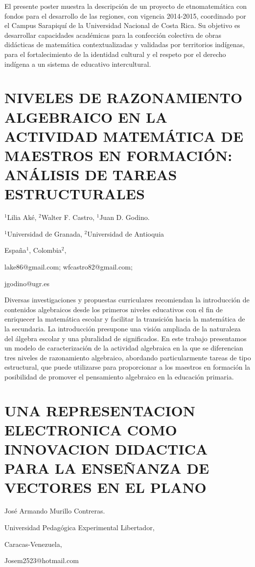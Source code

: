 El presente poster muestra la descripción de un proyecto de etnomatemática
con fondos para el desarrollo de las regiones, con vigencia 2014-2015,
coordinado por el Campus Sarapiquí de la Universidad Nacional de Costa
Rica. Su objetivo es desarrollar capacidades académicas para la confección
colectiva de obras didácticas de matemática contextualizadas y validadas
por territorios indígenas, para el fortalecimiento de la identidad
cultural y el respeto por el derecho indígena a un sistema de educativo
intercultural. 


\section{NIVELES DE RAZONAMIENTO ALGEBRAICO EN LA ACTIVIDAD MATEMÁTICA DE
MAESTROS EN FORMACIÓN: ANÁLISIS DE TAREAS ESTRUCTURALES}

\begin{datos}

$^{1}$Lilia Aké, $^{2}$Walter F. Castro, $^{1}$Juan D. Godino. 

$^{1}$Universidad de Granada, $^{2}$Universidad de Antioquia

España$^{1}$, Colombia$^{2}$,

lake86@gmail.com; wfcastro82@gmail.com;

jgodino@ugr.es

\end{datos}

Diversas investigaciones y propuestas curriculares recomiendan la
introducción de contenidos algebraicos desde los primeros niveles
educativos con el fin de enriquecer la matemática escolar y facilitar
la transición hacia la matemática de la secundaria. La introducción
presupone una visión ampliada de la naturaleza del álgebra escolar
y una pluralidad de significados. En este trabajo presentamos un modelo
de caracterización de la actividad algebraica en la que se diferencian
tres niveles de razonamiento algebraico, abordando particularmente
tareas de tipo estructural, que puede utilizarse para proporcionar
a los maestros en formación la posibilidad de promover el pensamiento
algebraico en la educación primaria.


\section{UNA REPRESENTACION ELECTRONICA COMO INNOVACION DIDACTICA PARA LA
ENSEÑANZA DE VECTORES EN EL PLANO }

\begin{datos}

José Armando Murillo Contreras.

Universidad Pedagógica Experimental Libertador,

Caracas-Venezuela,

Josem2523@hotmail.com

\end{datos}

